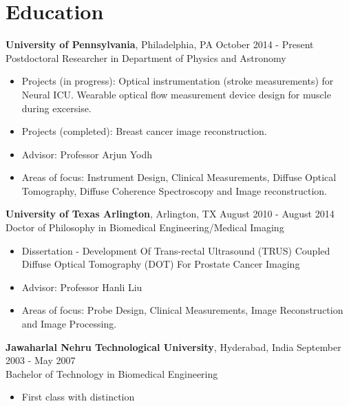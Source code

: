 \documentclass{my_cv}
\begin{document}

\section{Education}
\begin{flushleft}  
\textbf{University of Pennsylvania}, Philadelphia, PA  \hfill October 2014 - Present \\ 
Postdoctoral Researcher in Department of Physics and Astronomy \\ 
\vspace{-3mm}
\begin{itemize}\itemsep -2pt
\item Projects (in progress): Optical instrumentation (stroke measurements) for Neural ICU. Wearable optical flow measurement device design for muscle during excersise.  
\item Projects (completed): Breast cancer image reconstruction. 
\item Advisor: Professor Arjun Yodh
\item Areas of focus: Instrument Design, Clinical Measurements, Diffuse Optical Tomography, Diffuse Coherence Spectroscopy and Image reconstruction.
\end{itemize}


\textbf{University of Texas Arlington}, Arlington, TX \hfill August 2010 - August 2014 \\ 
Doctor of Philosophy in Biomedical Engineering/Medical Imaging \\
\vspace{-3mm}
\begin{itemize}\itemsep -2pt
\item Dissertation -  Development Of Trans-rectal Ultrasound (TRUS) Coupled Diffuse Optical Tomography (DOT) For Prostate Cancer Imaging
\item Advisor: Professor Hanli Liu 
\item Areas of focus: Probe Design, Clinical Measurements, Image Reconstruction and Image Processing.
\end{itemize}
 
\textbf{Jawaharlal Nehru Technological University}, Hyderabad, India \hfill September 2003 - May 2007\\
Bachelor of Technology in Biomedical Engineering \\ 
\vspace{-3mm}
\begin{itemize}
\setlength\itemsep{0em} 
\item First class with distinction
\end{itemize}
\end{flushleft}  
 
\end{document}
